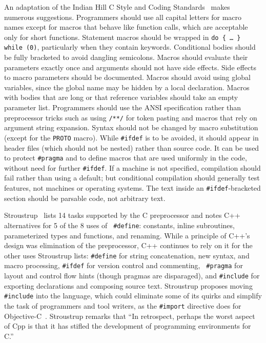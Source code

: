 \documentclass[10pt]{article}
\begin{document}
An adaptation of the Indian Hill C Style and Coding
Standards~\cite{Cannon90} makes numerous suggestions. Programmers should use all capital letters for macro
names except for macros that behave like function calls, which are
acceptable only for short functions.  Statement macros should be wrapped in
{\tt do \verb|{| \ldots{} \verb|}| while (0)}, particularly when they contain keywords.
Conditional bodies should be fully bracketed to avoid dangling semicolons.
Macros should evaluate their parameters exactly once and arguments should
not have side effects.  Side effects to macro parameters should be
documented.  Macros should avoid using global variables, since the global name may
be hidden by a local declaration.  Macros with bodies that are long or
that reference variables should take an empty parameter list.  Programmers
should use the ANSI specification rather than preprocessor tricks such as
using {\tt /**/} for token pasting and macros that rely on argument string
expansion.  Syntax should not be changed by macro substitution (except for
the {\tt PROTO} macro).  While {\tt \#ifdef} is to be avoided, it should
appear in header files (which should not be nested) rather than source
code.  It can be used to protect {\tt \#pragma} and to define macros that
are used uniformly in the code, without need for further {\tt \#ifdef}.  If
a machine is not specified, compilation should fail rather than using a
default; but conditional compilation should generally test features, not
machines or operating systems.  The text inside an {\tt \#ifdef}-bracketed section
should be parsable code, not arbitrary text.

Stroustrup~\cite{Stroustrup-DesignEvolution} lists 14 tasks supported by
the C preprocessor and notes C++ alternatives for 5 of the 8 uses of {\tt
\#define}:  constants, inline subroutines, parameterized types and
functions, and renaming.  While a principle of C++'s design was elimination
of the preprocessor, C++ continues to rely on it for the other uses
Stroustrup lists:  {\tt \#define} for string concatenation, new syntax, and
macro processing, {\tt \#ifdef} for version control and commenting, {\tt
\#pragma} for layout and control flow hints (though pragmas are
disparaged), and {\tt \#include} for exporting declarations and composing
source text.  Stroustrup proposes moving {\tt \#include} into the language,
which could eliminate some of its quirks and simplify the task of
programmers and tool writers, as the {\tt \#import} directive does for
Objective-C~\cite{CoxN91}.  Stroustrup remarks that ``In retrospect,
perhaps the worst aspect of Cpp is that it has stifled the development of
programming environments for C.''
\end{document}
